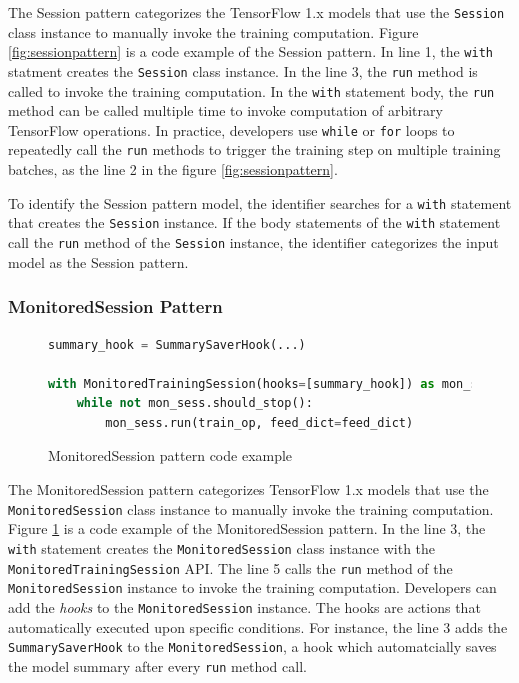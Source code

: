 The Session pattern categorizes the TensorFlow 1.x models that
use the {\tt Session} class instance to manually invoke the training 
computation. Figure \ref{fig:sessionpattern} is a code example of the Session 
pattern. In line 1, the {\tt with} statment creates the {\tt Session}
class instance. In the line 3, the {\tt run} method is called to invoke 
the training computation. 
In the {\tt with} statement body, the {\tt run} method can be called multiple
time to invoke computation of arbitrary TensorFlow operations.
In practice, developers use {\tt while} or {\tt for} loops to repeatedly call
the {\tt run} methods to trigger the training step on multiple training batches,
as the line 2 in the figure \ref{fig:sessionpattern}.

To identify the Session pattern model, the identifier 
searches for a {\tt with} statement that creates the {\tt Session} instance.
If the body statements of the {\tt with} statement call the 
{\tt run} method of the {\tt Session} instance,
the identifier categorizes the input model as the Session pattern. 


\subsubsection{MonitoredSession Pattern}

\begin{figure}[!ht]
  \begin{lstlisting}[language=Python]
summary_hook = SummarySaverHook(...)

with MonitoredTrainingSession(hooks=[summary_hook]) as mon_sess:
    while not mon_sess.should_stop():
        mon_sess.run(train_op, feed_dict=feed_dict)
  \end{lstlisting}
  \caption{MonitoredSession pattern code example}
  \label{fig:monsesspattern}
\end{figure}

The MonitoredSession pattern categorizes TensorFlow 1.x models that
use the {\tt MonitoredSession} class instance to manually invoke the 
training computation.
Figure \ref{fig:monsesspattern} is a code example of the MonitoredSession 
pattern.
In the line 3, the {\tt with} statement creates the {\tt MonitoredSession}
class instance with the {\tt MonitoredTrainingSession} API.
The line 5 calls the {\tt run} method of the {\tt MonitoredSession} instance 
to invoke the training computation.
Developers can add the \textit{hooks} to the
{\tt MonitoredSession} instance. The hooks are actions that automatically 
executed upon specific conditions. 
For instance, the line 3 adds the {\tt SummarySaverHook} to the
{\tt MonitoredSession}, a hook which automatcially saves the model summary 
after every {\tt run} method call.

